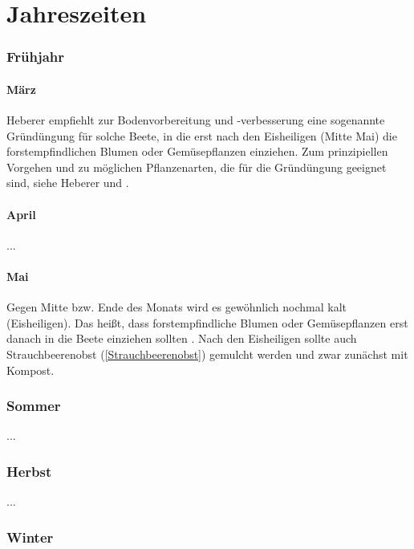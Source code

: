 \part{Jahreszeiten}

\section{Frühjahr}

\subsection{März}
\label{Mai}
Heberer \cite[S.~11]{Heberer2018} empfiehlt zur Bodenvorbereitung und -verbesserung eine sogenannte Gründüngung für solche Beete, in die erst nach den Eisheiligen (Mitte Mai) die forstempfindlichen Blumen oder Gemüsepflanzen einziehen.
Zum prinzipiellen Vorgehen und zu möglichen Pflanzenarten, die für die Gründüngung geeignet sind, siehe Heberer \cite[S.~11]{Heberer2018} und \cite[S.~114f]{Heberer2018}.

\subsection{April}

...

\subsection{Mai}

Gegen Mitte bzw. Ende des Monats wird es gewöhnlich nochmal kalt (Eisheiligen).
Das heißt, dass forstempfindliche Blumen oder Gemüsepflanzen erst danach in die Beete einziehen sollten \cite[S.~11]{Heberer2018}.
Nach den Eisheiligen sollte auch \textrightarrow Strauchbeerenobst (\ref{Strauchbeerenobst}) gemulcht werden und zwar zunächst mit Kompost.

\section{Sommer}

...

\section{Herbst}

...

\pagebreak

\section{Winter}

